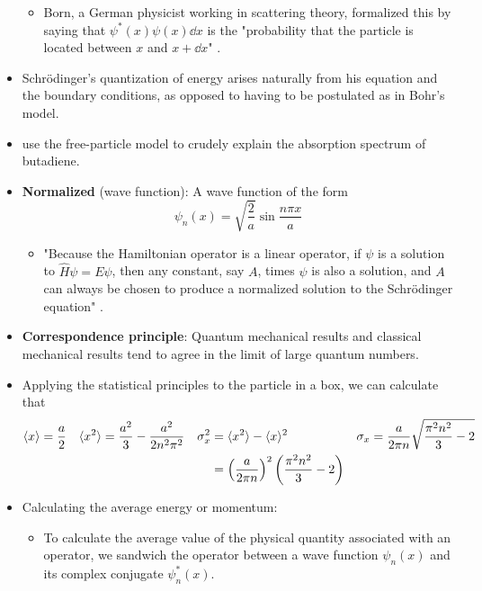 \documentclass[../notes.tex]{subfiles}
\begin{document}
\begin{itemize}
    \begin{itemize}
        \item Born, a German physicist working in scattering theory, formalized this by saying that $\psi^*(x)\psi(x)\dd{x}$ is the "probability that the particle is located between $x$ and $x+\dd{x}$" \parencite[80]{bib:McQuarrieSimon}.
    \end{itemize}
    \item Schr\"{o}dinger's quantization of energy arises naturally from his equation and the boundary conditions, as opposed to having to be postulated as in Bohr's model.
    \item \textcite{bib:McQuarrieSimon} use the free-particle model to crudely explain the absorption spectrum of butadiene.
    \item \textbf{Normalized} (wave function): A wave function of the form
    \begin{equation*}
        \psi_n(x) = \sqrt{\frac{2}{a}}\sin\frac{n\pi x}{a}
    \end{equation*}
    \begin{itemize}
        \item "Because the Hamiltonian operator is a linear operator, if $\psi$ is a solution to $\hat{H}\psi=E\psi$, then any constant, say $A$, times $\psi$ is also a solution, and $A$ can always be chosen to produce a normalized solution to the Schr\"{o}dinger equation" \parencite[84]{bib:McQuarrieSimon}.
    \end{itemize}
    \item \textbf{Correspondence principle}: Quantum mechanical results and classical mechanical results tend to agree in the limit of large quantum numbers.
    \item Applying the statistical principles to the particle in a box, we can calculate that
    \begin{align*}
        \langle{x}\rangle &= \frac{a}{2}&
            \langle{x^2}\rangle &= \frac{a^2}{3}-\frac{a^2}{2n^2\pi^2}&
                \sigma_x^2 &= \langle{x^2}\rangle-\langle{x}\rangle^2&
                    \sigma_x &= \frac{a}{2\pi n}\sqrt{\frac{\pi^2n^2}{3}-2}\\
        &&
            &&
                &= \left( \frac{a}{2\pi n} \right)^2\left( \frac{\pi^2n^2}{3}-2 \right)
    \end{align*}
    \item Calculating the average energy or momentum:
    \begin{itemize}
        \item To calculate the average value of the physical quantity associated with an operator, we sandwich the operator between a wave function $\psi_n(x)$ and its complex conjugate $\psi_n^*(x)$.

\end{itemize}
\end{itemize}
\end{document}
